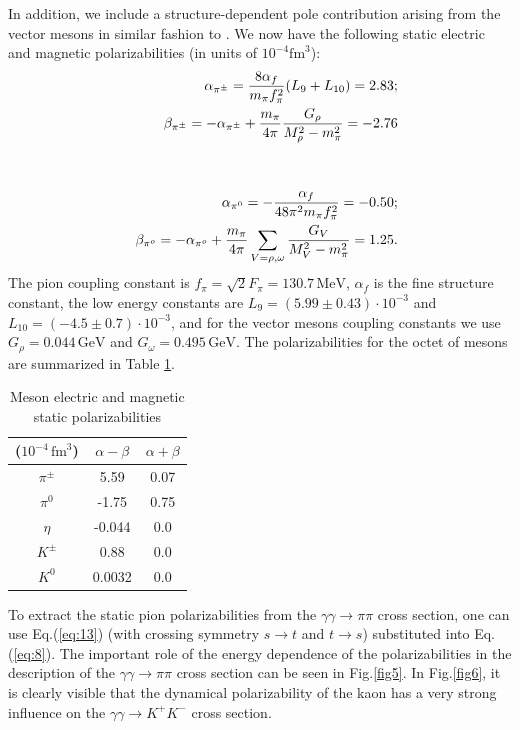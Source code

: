 \documentclass[3p,times,twocolumn]{revtex4}
\begin{document}
In addition, we include a structure-dependent pole contribution arising from the
vector mesons in similar fashion to \cite{Ba92,Do93}. We now have the following static electric and
magnetic polarizabilities (in units of $10^{-4}\mbox{fm}^{3}$):
\begin{eqnarray}
&&\alpha_{\pi^{\pm}}=\frac{8\alpha_{f}}{m_{\pi}f_{\pi}^{2}}(L_{9}+L_{10})=2.83; \nonumber \\ 
&&\beta_{\pi^{\pm}}=-\alpha_{\pi^{\pm}}+\frac{m_{\pi}}{4\pi}\frac{G_{\rho}}{M_{\rho}^{2}-m_{\pi}^{2}}=-2.76\nonumber \\
\label{eq:14} \nonumber \\ \nonumber \\
&&\alpha_{\pi^{0}}=-\frac{\alpha_{f}}{48\pi^{2}m_{\pi}f_{\pi}^{2}}=-0.50; \nonumber \\
&&\beta_{\pi^{o}}=-\alpha_{\pi^{o}}+\frac{m_{\pi}}{4\pi}\sum_{V=\rho,\omega}\frac{G_{V}}{M_{V}^{2}-m_{\pi}^{2}}=1.25 \space .
\end{eqnarray}
The pion coupling constant is $f_{\pi}=\sqrt{2}F_{\pi}=130.7\,\mbox{MeV}$,
$\alpha_{f}$ is the fine structure constant, the low energy constants are $L_{9}=(5.99\pm0.43)\cdot10^{-3}$
and $L_{10}=(-4.5\pm0.7)\cdot10^{-3}$, and for the vector mesons coupling
constants we use $G_{\rho}=0.044\,\mbox{GeV}$ and $G_{\omega}=0.495\,\mbox{GeV}$.
The polarizabilities
for the octet of mesons are summarized in Table \ref{tbl1}.
\begin{table}
\begin{centering}
\begin{tabular}{|c|c|c|}
\hline 
($10^{-4}\,\mbox{fm}^{3}$) & $\alpha-\beta$ & $\alpha+\beta$\tabularnewline
\hline 
\hline 
$\pi^{\pm}$ & 5.59 & 0.07\tabularnewline
\hline 
$\pi^{0}$ & -1.75 & 0.75\tabularnewline
\hline 
$\eta$ & -0.044 & 0.0\tabularnewline
\hline 
$K^{\pm}$ & 0.88 & 0.0\tabularnewline
\hline 
$K^{0}$ & 0.0032 & 0.0\tabularnewline
\hline 
\end{tabular}
\par\end{centering}

\caption{Meson electric and magnetic static polarizabilities}


\label{tbl1}
\end{table}

To extract the static pion polarizabilities from the $\gamma\gamma\rightarrow\pi\pi$
cross section, one can use Eq.(\ref{eq:13}) (with crossing symmetry $s\rightarrow t$ and $t\rightarrow s$)
substituted into Eq.(\ref{eq:8}). The important role of the energy dependence of the polarizabilities
in the description of the $\gamma\gamma\rightarrow\pi\pi$ cross section can be seen in Fig.\ref{fig5}.
In Fig.\ref{fig6}, it is clearly visible that the dynamical polarizability
of the kaon has a very strong influence on the $\gamma\gamma\rightarrow K^{+}K^{-}$
cross section. 
\end{document}
